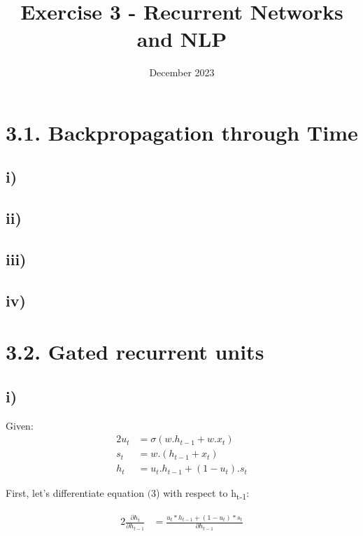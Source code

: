 

\title{Exercise 3 - Recurrent Networks and NLP}
\date{December 2023}



\maketitle
\section*{3.1. Backpropagation through Time}
\subsection*{i)}

\subsection*{ii)}

\subsection*{iii)}


\subsection*{iv)}


\section*{3.2. Gated recurrent units}
\subsection*{i)}

Given:
\begin{alignat}{2}
    u_t &= \sigma (w.h_{t-1} + w.x_t)
    \\s_t &= w. (h_{t-1} + x_t)
    \\h_t &= u_t. h_{t-1}  + (1-u_t) . s_t
\end{alignat}

First, let's differentiate equation \((3\)) with respect to h\textsubscript{t-1}:

\begin{alignat}{2}
\frac {\partial h_t}{\partial h_{t-1}} &= \frac {u_t * h_{t-1} + (1-u_t) * s_t}{\partial h_{t-1}}
\end{alignat}

